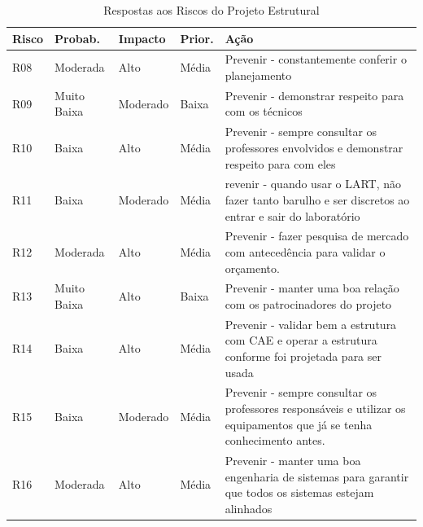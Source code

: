 \begin{table}[H]
\centering
\caption{Respostas aos Riscos do Projeto Estrutural }
\label{respostas-riscos-negativos}
\begin{tabular}{|l|l|l|l|p{9cm}|}
\hline
Risco & Probab.    & Impacto    & Prior. & Ação      \\
\hline
R08 & Moderada & Alto & Média & Prevenir - constantemente conferir o planejamento\\
R09 & Muito Baixa & Moderado & Baixa & Prevenir - demonstrar respeito para com os técnicos\\
R10 & Baixa & Alto & Média & Prevenir - sempre consultar os professores envolvidos e demonstrar respeito para com eles \\
R11 & Baixa & Moderado & Média & revenir - quando usar o LART, não fazer tanto barulho e ser discretos ao entrar e sair do laboratório \\
R12 & Moderada & Alto & Média & Prevenir - fazer pesquisa de mercado com antecedência para validar o orçamento.\\
R13 & Muito Baixa & Alto & Baixa & Prevenir - manter uma boa relação com os patrocinadores do projeto\\
R14 & Baixa & Alto & Média & Prevenir - validar bem a estrutura com CAE e operar a estrutura conforme foi projetada para ser usada \\
R15 & Baixa & Moderado & Média & Prevenir - sempre consultar os professores responsáveis e utilizar os equipamentos que já se tenha conhecimento antes. \\
R16 & Moderada & Alto & Média & Prevenir - manter uma boa engenharia de sistemas para garantir que todos os sistemas estejam alinhados \\
\hline
\end{tabular}
\end{table}



